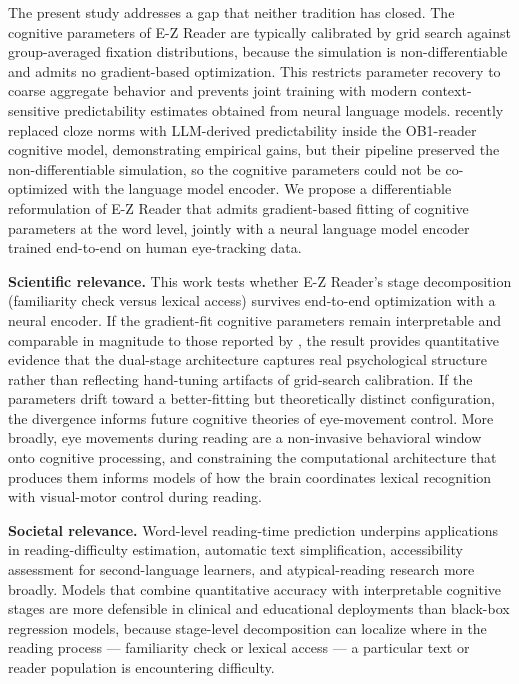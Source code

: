 \documentclass[12pt]{article}
\begin{document}
The present study addresses a gap that neither tradition has closed. The
cognitive parameters of E-Z Reader are typically calibrated by grid search
against group-averaged fixation distributions, because the simulation is
non-differentiable and admits no gradient-based optimization. This restricts
parameter recovery to coarse aggregate behavior and prevents joint training
with modern context-sensitive predictability estimates obtained from neural
language models. \citet{lopesrego2024language} recently replaced cloze norms
with LLM-derived predictability inside the OB1-reader cognitive model,
demonstrating empirical gains, but their pipeline preserved the
non-differentiable simulation, so the cognitive parameters could not be
co-optimized with the language model encoder. We propose a differentiable
reformulation of E-Z Reader that admits gradient-based fitting of cognitive
parameters at the word level, jointly with a neural language model encoder
trained end-to-end on human eye-tracking data.

\noindent\textbf{Scientific relevance.} This work tests whether E-Z Reader's
stage decomposition (familiarity check versus lexical access) survives
end-to-end optimization with a neural encoder. If the gradient-fit cognitive
parameters remain interpretable and comparable in magnitude to those reported
by \citet{reichle1998toward}, the result provides quantitative evidence that
the dual-stage architecture captures real psychological structure rather than
reflecting hand-tuning artifacts of grid-search calibration. If the parameters
drift toward a better-fitting but theoretically distinct configuration, the
divergence informs future cognitive theories of eye-movement control. More
broadly, eye movements during reading are a non-invasive behavioral window
onto cognitive processing, and constraining the computational architecture
that produces them informs models of how the brain coordinates lexical
recognition with visual-motor control during reading.

\noindent\textbf{Societal relevance.} Word-level reading-time prediction
underpins applications in reading-difficulty estimation, automatic text
simplification, accessibility assessment for second-language learners, and
atypical-reading research more broadly. Models that combine quantitative
accuracy with interpretable cognitive stages are more defensible in clinical
and educational deployments than black-box regression models, because
stage-level decomposition can localize where in the reading process ---
familiarity check or lexical access --- a particular text or reader
population is encountering difficulty.
\end{document}
